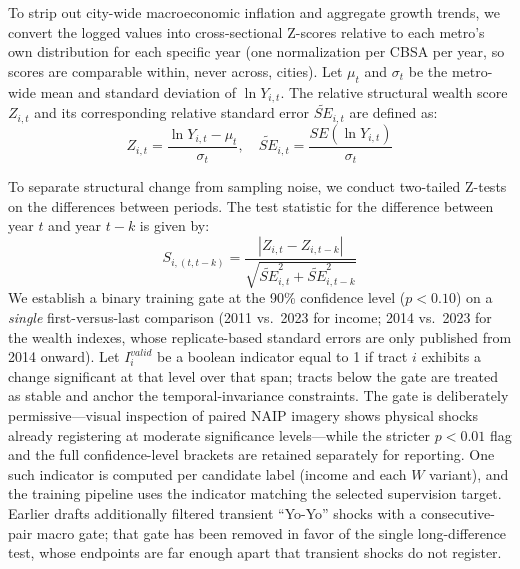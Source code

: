 \documentclass[conference]{IEEEtran}
\begin{document}
To strip out city-wide macroeconomic inflation and aggregate growth trends, we convert the logged values into cross-sectional Z-scores relative to each metro's own distribution for each specific year (one normalization per CBSA per year, so scores are comparable within, never across, cities). Let $\mu_t$ and $\sigma_t$ be the metro-wide mean and standard deviation of $\ln Y_{i,t}$. The relative structural wealth score $Z_{i,t}$ and its corresponding relative standard error $\tilde{SE}_{i,t}$ are defined as:
\begin{equation}
Z_{i,t} = \frac{\ln Y_{i,t} - \mu_t}{\sigma_t}, \quad \tilde{SE}_{i,t} = \frac{SE(\ln Y_{i,t})}{\sigma_t}
\end{equation}

To separate structural change from sampling noise, we conduct two-tailed Z-tests on the differences between periods. The test statistic for the difference between year $t$ and year $t-k$ is given by:
\begin{equation}
S_{i, (t, t-k)} = \frac{|Z_{i,t} - Z_{i,t-k}|}{\sqrt{\tilde{SE}_{i,t}^2 + \tilde{SE}_{i,t-k}^2}}
\end{equation}
We establish a binary training gate at the 90\% confidence level ($p < 0.10$) on a \emph{single} first-versus-last comparison (2011 vs.\ 2023 for income; 2014 vs.\ 2023 for the wealth indexes, whose replicate-based standard errors are only published from 2014 onward). Let $I_{i}^{valid}$ be a boolean indicator equal to 1 if tract $i$ exhibits a change significant at that level over that span; tracts below the gate are treated as stable and anchor the temporal-invariance constraints. The gate is deliberately permissive---visual inspection of paired NAIP imagery shows physical shocks already registering at moderate significance levels---while the stricter $p<0.01$ flag and the full confidence-level brackets are retained separately for reporting. One such indicator is computed per candidate label (income and each $W$ variant), and the training pipeline uses the indicator matching the selected supervision target. Earlier drafts additionally filtered transient ``Yo-Yo'' shocks with a consecutive-pair macro gate; that gate has been removed in favor of the single long-difference test, whose endpoints are far enough apart that transient shocks do not register.
\end{document}
